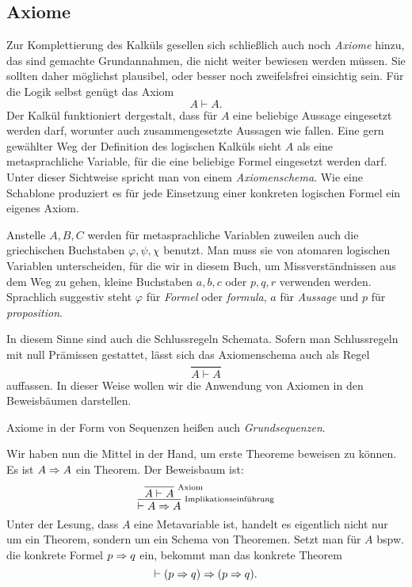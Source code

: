 \subsection{Axiome}

Zur Komplettierung des Kalküls gesellen sich schließlich auch noch
\emph{Axiome} hinzu, das sind gemachte Grundannahmen, die
nicht weiter bewiesen werden müssen. Sie sollten daher möglichst
plausibel, oder besser noch zweifelsfrei einsichtig sein. Für die Logik
selbst genügt das Axiom
\[A\vdash A.\]
Der Kalkül funktioniert dergestalt, dass für $A$ eine beliebige Aussage
eingesetzt werden darf, worunter auch zusammengesetzte Aussagen
wie fallen. Eine gern gewählter Weg der Definition des logischen
Kalküls sieht $A$ als eine metasprachliche Variable, für die eine
beliebige Formel eingesetzt werden darf. Unter dieser Sichtweise
spricht man von einem \emph{Axiomenschema}. Wie
eine Schablone produziert es für jede Einsetzung einer konkreten
logischen Formel ein eigenes Axiom.

Anstelle $A,B,C$ werden für metasprachliche Variablen zuweilen auch
die griechischen Buchstaben $\varphi,\psi,\chi$ benutzt. Man muss sie
von atomaren logischen Variablen unterscheiden, für die wir in diesem
Buch, um Missverständnissen aus dem Weg zu gehen, kleine Buchstaben
$a,b,c$ oder $p,q,r$ verwenden werden. Sprachlich suggestiv steht
$\varphi$ für \emph{Formel} oder \emph{formula}, $a$ für
\emph{Aussage} und $p$ für \emph{proposition}.

In diesem Sinne sind auch die Schlussregeln Schemata. Sofern man
Schlussregeln mit null Prämissen gestattet, lässt sich das
Axiomenschema auch als Regel
\[\dfrac{}{A\vdash A}\]
auffassen. In dieser Weise wollen wir die Anwendung von Axiomen in den
Beweisbäumen darstellen.

Axiome in der Form von Sequenzen heißen auch
\emph{Grundsequenzen}.

Wir haben nun die Mittel in der Hand, um erste Theoreme beweisen
zu können. Es ist $A\Rightarrow A$ ein Theorem. Der Beweisbaum ist:
\[
\infer[\infernote{Implikationseinführung}]{\vdash A\cond A}{
  \infer[\infernote{Axiom}]{A\vdash A}{}}
\]
Unter der Lesung, dass $A$ eine Metavariable ist, handelt es
eigentlich nicht nur um ein Theorem, sondern um ein Schema von
Theoremen. Setzt man für $A$ bspw. die konkrete Formel $p\Rightarrow q$
ein, bekommt man das konkrete Theorem
\[\vdash (p\Rightarrow q)\Rightarrow (p\Rightarrow q).\]

